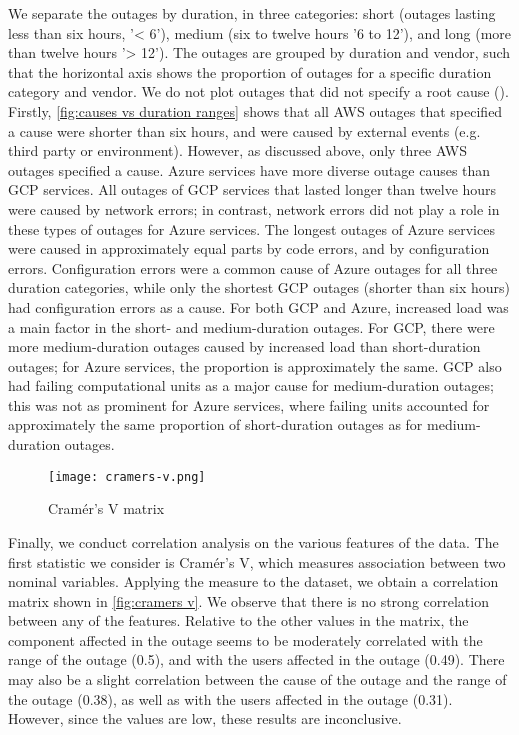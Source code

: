 We separate the outages by duration, in three categories: short (outages lasting less than six hours, '< 6'), medium (six to twelve hours '6 to 12'), and long (more than twelve hours '> 12').
The outages are grouped by duration and vendor, such that the horizontal axis shows the proportion of outages for a specific duration category and vendor.
We do not plot outages that did not specify a root cause ().
Firstly, \autoref{fig:causes vs duration ranges} shows that all AWS outages that specified a cause were shorter than six hours, and were caused by external events (e.g. third party or environment).
However, as discussed above, only three AWS outages specified a cause.
Azure services have more diverse outage causes than GCP services.
All outages of GCP services that lasted longer than twelve hours were caused by network errors; in contrast, network errors did not play a role in these types of outages for Azure services.
The longest outages of Azure services were caused in approximately equal parts by code errors, and by configuration errors.
Configuration errors were a common cause of Azure outages for all three duration categories, while only the shortest GCP outages (shorter than six hours) had configuration errors as a cause.
For both GCP and Azure, increased load was a main factor in the short- and medium-duration outages.
For GCP, there were more medium-duration outages caused by increased load than short-duration outages; for Azure services, the proportion is approximately the same.
GCP also had failing computational units as a major cause for medium-duration outages; this was not as prominent for Azure services, where failing units accounted for approximately the same proportion of short-duration outages as for medium-duration outages.

\begin{figure}[h]
  \centering
  \texttt{[image: cramers-v.png]}
  \caption{Cram\'{e}r's V matrix}
  \label{fig:cramers v}
\end{figure}

Finally, we conduct correlation analysis on the various features of the data.
The first statistic we consider is Cram\'{e}r's V, which measures association between two nominal variables.
Applying the measure to the dataset, we obtain a correlation matrix shown in \autoref{fig:cramers v}.
We observe that there is no strong correlation between any of the features.
Relative to the other values in the matrix, the component affected in the outage seems to be moderately correlated with the range of the outage (0.5), and with the users affected in the outage (0.49).
There may also be a slight correlation between the cause of the outage and the range of the outage (0.38), as well as with the users affected in the outage (0.31).
However, since the values are low, these results are inconclusive.

